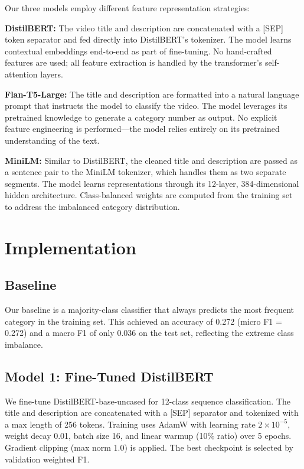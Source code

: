 \documentclass[11pt]{article}
\begin{document}
Our three models employ different feature representation strategies:

\textbf{DistilBERT:} The video title and description are concatenated with a [SEP] token separator and fed directly into DistilBERT's tokenizer. The model learns contextual embeddings end-to-end as part of fine-tuning. No hand-crafted features are used; all feature extraction is handled by the transformer's self-attention layers.

\textbf{Flan-T5-Large:} The title and description are formatted into a natural language prompt that instructs the model to classify the video. The model leverages its pretrained knowledge to generate a category number as output. No explicit feature engineering is performed---the model relies entirely on its pretrained understanding of the text.

\textbf{MiniLM:} Similar to DistilBERT, the cleaned title and description are passed as a sentence pair to the MiniLM tokenizer, which handles them as two separate segments. The model learns representations through its 12-layer, 384-dimensional hidden architecture. Class-balanced weights are computed from the training set to address the imbalanced category distribution.

\section{Implementation}

\subsection{Baseline}

Our baseline is a majority-class classifier that always predicts the most frequent category in the training set. This achieved an accuracy of 0.272 (micro F1 = 0.272) and a macro F1 of only 0.036 on the test set, reflecting the extreme class imbalance.

\subsection{Model 1: Fine-Tuned DistilBERT}

We fine-tune DistilBERT-base-uncased \citep{sanh2019distilbert} for 12-class sequence classification. The title and description are concatenated with a [SEP] separator and tokenized with a max length of 256 tokens. Training uses AdamW with learning rate $2{\times}10^{-5}$, weight decay 0.01, batch size 16, and linear warmup (10\% ratio) over 5 epochs. Gradient clipping (max norm 1.0) is applied. The best checkpoint is selected by validation weighted F1.
\end{document}
